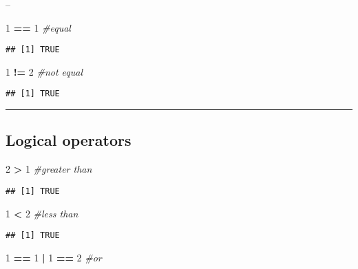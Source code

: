 \documentclass[]{article}
\newenvironment{Shaded}{\begin{snugshade}}{\end{snugshade}}
\newcommand{\CommentTok}[1]{\textcolor[rgb]{0.56,0.35,0.01}{\textit{#1}}}
\newcommand{\DecValTok}[1]{\textcolor[rgb]{0.00,0.00,0.81}{#1}}
\newcommand{\OperatorTok}[1]{\textcolor[rgb]{0.81,0.36,0.00}{\textbf{#1}}}
\newcommand{\StringTok}[1]{\textcolor[rgb]{0.31,0.60,0.02}{#1}}
\begin{document}
--

\begin{Shaded}
\begin{Highlighting}[]
\DecValTok{1} \OperatorTok{==}\StringTok{ }\DecValTok{1} \CommentTok{#equal}
\end{Highlighting}
\end{Shaded}

\begin{verbatim}
## [1] TRUE
\end{verbatim}

\begin{Shaded}
\begin{Highlighting}[]
\DecValTok{1} \OperatorTok{!=}\StringTok{ }\DecValTok{2} \CommentTok{#not equal}
\end{Highlighting}
\end{Shaded}

\begin{verbatim}
## [1] TRUE
\end{verbatim}

\begin{center}\rule{0.5\linewidth}{\linethickness}\end{center}

\hypertarget{logical-operators-1}{%
\subsection{Logical operators}\label{logical-operators-1}}

\begin{Shaded}
\begin{Highlighting}[]
\DecValTok{2} \OperatorTok{>}\StringTok{ }\DecValTok{1} \CommentTok{#greater than}
\end{Highlighting}
\end{Shaded}

\begin{verbatim}
## [1] TRUE
\end{verbatim}

\begin{Shaded}
\begin{Highlighting}[]
\DecValTok{1} \OperatorTok{<}\StringTok{ }\DecValTok{2} \CommentTok{#less than}
\end{Highlighting}
\end{Shaded}

\begin{verbatim}
## [1] TRUE
\end{verbatim}

\begin{Shaded}
\begin{Highlighting}[]
\DecValTok{1} \OperatorTok{==}\StringTok{ }\DecValTok{1} \OperatorTok{|}\StringTok{ }\DecValTok{1} \OperatorTok{==}\StringTok{ }\DecValTok{2} \CommentTok{#or}
\end{Highlighting}
\end{Shaded}
\end{document}
